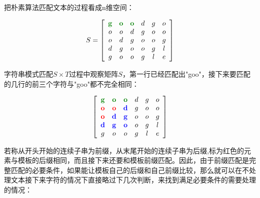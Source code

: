 \documentclass{article}
\begin{document}
	把朴素算法匹配文本的过程看成n维空间：

	$$
	S = 
	\left[\begin{array}{cccccc}
			\color{green!50!black}\mathbf{g} & \color{green!50!black}\mathbf{o} & \color{green!50!black}\mathbf{o} & d & g & o \\
			o&o&d&g&o&o \\ 
			o&d&g&o&o&g \\
			d&g&o&o&g&l \\
			g&o&o&g&l&e 
	\end{array}\right]
	$$
	
	字符串模式匹配$S \times T$过程中观察矩阵$S$，第一行已经匹配出"goo"，接下来要匹配的几行的前三个字符与"goo"都不完全相同：

	$$
	\left[\begin{array}{cccccc}
			\color{green!50!black}\mathbf{g} & \color{green!50!black}\mathbf{o} & \color{green!50!black}\mathbf{o} & d & g & o \\
			\color{red}\mathbf{o}&\color{red}\mathbf{o}&\color{blue}\mathbf{d}&g&o&o \\ 
			\color{red}\mathbf{o}&\color{blue}\mathbf{d}&\color{blue}\mathbf{g}&o&o&g \\
			\color{blue}\mathbf{d}&\color{blue}\mathbf{g}&\color{blue}\mathbf{o}&o&g&l \\
			g&o&o&g&l&e 
	\end{array}\right]
	$$

	若称从开头开始的连续子串为前缀，从末尾开始的连续子串为后缀,标为红色的元素与模板的后缀相同，而且接下来还要和模板前缀匹配。因此，由于前缀匹配是完整匹配的必要条件，如果能让模板自己的后缀和自己前缀比较，那么就可以在不处理文本接下来字符的情况下直接略过下几次判断，来找到满足必要条件的需要处理的情况：

	\vspace{0.7cm}

\end{document}
